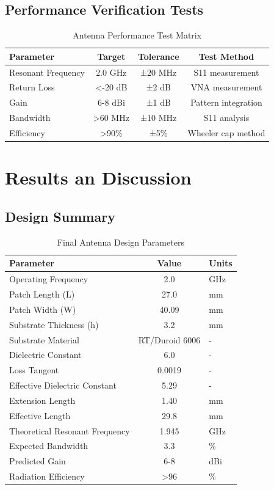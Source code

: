 \documentclass[12pt]{article}
\begin{document}
\subsection{Performance Verification Tests}

\begin{table}[H]
\centering
\caption{Antenna Performance Test Matrix}
\begin{tabular}{|l|c|c|c|}
\hline
\textbf{Parameter} & \textbf{Target} & \textbf{Tolerance} & \textbf{Test Method} \\
\hline
Resonant Frequency & 2.0 GHz & ±20 MHz & S11 measurement \\
Return Loss & <-20 dB & ±2 dB & VNA measurement \\
Gain & 6-8 dBi & ±1 dB & Pattern integration \\
Bandwidth & >60 MHz & ±10 MHz & S11 analysis \\
Efficiency & >90\% & ±5\% & Wheeler cap method \\
\hline
\end{tabular}
\end{table}


\section{Results an Discussion}

\subsection{Design Summary}

\begin{table}[H]
\centering
\caption{Final Antenna Design Parameters}
\begin{tabular}{|l|c|l|}
\hline
\textbf{Parameter} & \textbf{Value} & \textbf{Units} \\
\hline
Operating Frequency & 2.0 & GHz \\
Patch Length (L) & 27.0 & mm \\
Patch Width (W) & 40.09 & mm \\
Substrate Thickness (h) & 3.2 & mm \\
Substrate Material & RT/Duroid 6006 & - \\
Dielectric Constant & 6.0 & - \\
Loss Tangent & 0.0019 & - \\
Effective Dielectric Constant & 5.29 & - \\
Extension Length & 1.40 & mm \\
Effective Length & 29.8 & mm \\
Theoretical Resonant Frequency & 1.945 & GHz \\
Expected Bandwidth & 3.3 & \% \\
Predicted Gain & 6-8 & dBi \\
Radiation Efficiency & >96 & \% \\
\hline
\end{tabular}
\end{table}
\end{document}
